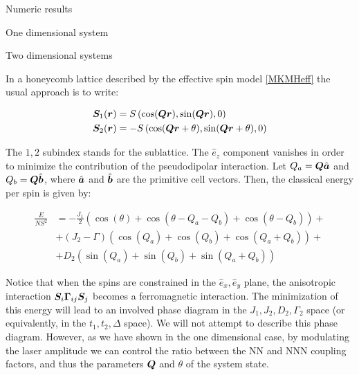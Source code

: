 \begin{section}{Numeric results}
\begin{subsection}{One dimensional system}
\end{subsection}

\begin{subsection}{Two dimensional systems}
 
In a honeycomb lattice described by the effective spin model \ref{MKMHeff} the usual approach is to write:

\begin{align}
\boldsymbol{S}_1(\boldsymbol{r}) &= S\left( \cos(\boldsymbol{Q}\boldsymbol{r}), \sin(\boldsymbol{Q}\boldsymbol{r}), 0 \right) \\
\boldsymbol{S}_2(\boldsymbol{r}) &= -S\left( \cos(\boldsymbol{Q}\boldsymbol{r} + \theta), \sin(\boldsymbol{Q}\boldsymbol{r} + \theta), 0 \right)
\end{align}

The $1, 2$ subindex stands for the sublattice. The $\hat{e}_z$ component vanishes in order to minimize the contribution of the pseudodipolar interaction. Let $Q_a = \boldsymbol{Q}\hat{\boldsymbol{a}}$ and $Q_b = \boldsymbol{Q}\hat{\boldsymbol{b}}$, where $\hat{\boldsymbol{a}}$ and $\hat{\boldsymbol{b}}$ are the primitive cell vectors. Then, the classical energy per spin is given by:

\begin{align}
\frac{E}{NS^2} &= -\frac{J_1}{2}\left( \cos(\theta) + \cos(\theta - Q_a - Q_b) + \cos(\theta - Q_b) \right) + \nonumber \\
&+ (J_2-\Gamma) \left( \cos(Q_a) + \cos(Q_b) + \cos(Q_a+Q_b) \right)+ \nonumber \\
&+D_2\left( \sin(Q_a) + \sin(Q_b) + \sin(Q_a+Q_b) \right)
\end{align}

Notice that when the spins are constrained in the $\hat{e}_x, \hat{e}_y$ plane, the anisotropic interaction $\boldsymbol{S}_i\boldsymbol{\Gamma}_{ij}\boldsymbol{S}_j$ becomes a ferromagnetic interaction. The minimization of this energy will lead to an involved phase diagram in the $J_1, J_2, D_2, \Gamma_2$ space (or equivalently, in the $t_1, t_2, \Delta$ space). We will not attempt to describe this phase diagram. However, as we have shown in the one dimensional case, by modulating the laser amplitude we can control the ratio between the NN and NNN coupling factors, and thus the parameters $\boldsymbol{Q}$ and $\theta$ of the system state.

\end{subsection}

\end{section}
